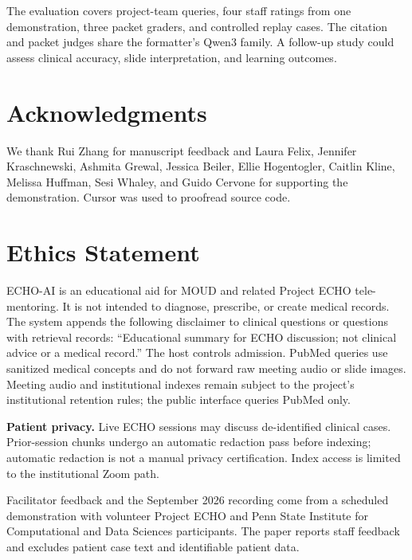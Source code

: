 \documentclass[11pt]{article}
\begin{document}
The evaluation covers project-team queries, four staff ratings from one demonstration, three packet graders, and controlled replay cases. The citation and packet judges share the formatter's Qwen3 family. A follow-up study could assess clinical accuracy, slide interpretation, and learning outcomes.

\section*{Acknowledgments}

We thank Rui Zhang for manuscript feedback and Laura Felix, Jennifer Kraschnewski, Ashmita Grewal, Jessica Beiler, Ellie Hogentogler, Caitlin Kline, Melissa Huffman, Sesi Whaley, and Guido Cervone for supporting the demonstration. Cursor was used to proofread source code.

\clearpage
\nobalance
\section*{Ethics Statement}

ECHO-AI is an educational aid for MOUD and related Project ECHO tele-mentoring. It is not intended to diagnose, prescribe, or create medical records. The system appends the following disclaimer to clinical questions or questions with retrieval records: ``Educational summary for ECHO discussion; not clinical advice or a medical record.'' The host controls admission. PubMed queries use sanitized medical concepts and do not forward raw meeting audio or slide images. Meeting audio and institutional indexes remain subject to the project's institutional retention rules; the public interface queries PubMed only.

\textbf{Patient privacy.} Live ECHO sessions may discuss de-identified clinical cases. Prior-session chunks undergo an automatic redaction pass before indexing; automatic redaction is not a manual privacy certification. Index access is limited to the institutional Zoom path.

Facilitator feedback and the September 2026 recording come from a scheduled demonstration with volunteer Project ECHO and Penn State Institute for Computational and Data Sciences participants. The paper reports staff feedback and excludes patient case text and identifiable patient data.
\end{document}
